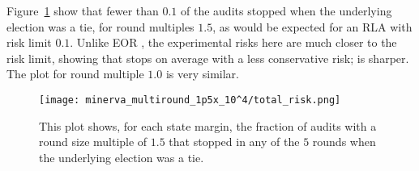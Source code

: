 
Figure~\ref{fig:minerva1p5_risk} show that fewer than $0.1$ of the audits stopped when the underlying election was a tie, for round multiples $1.5$, as would be expected for an RLA with risk limit $0.1$. 
Unlike EOR \BRAVO, the experimental risks here are much closer to the risk limit,
showing that \Minerva stops on average with a less conservative risk; \Minerva is sharper. The plot for round multiple $1.0$ is very similar. 





\begin{figure}
\begin{centering}
\texttt{[image: minerva\_multiround\_1p5x\_10^4/total\_risk.png]}
\caption{This plot shows, for each state margin,
the fraction of \Minerva audits with a round size multiple of $1.5$ that stopped in any of the $5$ rounds when the underlying election was a tie.}
\label{fig:minerva1p5_risk}
\end{centering}
\end{figure}




